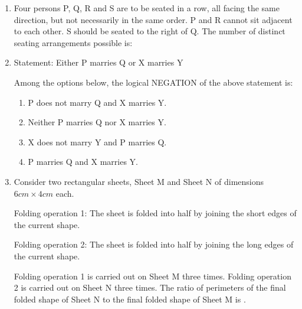 \documentclass[journal,12pt,onecolumn]{article}
\theoremstyle{remark}
\begin{document}
\begin{enumerate}
\item Four persons P, Q, R and S are to be seated in a row, all facing the same direction, but not necessarily in the same order. P and R cannot sit adjacent to each other. S should be seated to the right of Q. The number of distinct seating arrangements possible is:

\hfill{}
\begin{enumerate}
\end{enumerate}

\item Statement: Either P marries Q or X marries Y

Among the options below, the logical NEGATION of the above statement is:

\hfill{}
\begin{enumerate}
    \item P does not marry Q and X marries Y.
    \item Neither P marries Q nor X marries Y.
    \item X does not marry Y and P marries Q.
    \item P marries Q and X marries Y.
\end{enumerate}

\item Consider two rectangular sheets, Sheet M and Sheet N of dimensions $6cm \times 4cm$ each.

Folding operation 1: The sheet is folded into half by joining the short edges of the current shape.

Folding operation 2: The sheet is folded into half by joining the long edges of the current shape.

Folding operation 1 is carried out on Sheet M three times.
Folding operation 2 is carried out on Sheet N three times.
The ratio of perimeters of the final folded shape of Sheet N to the final folded shape of Sheet M is \underline{\hspace{2cm}}.

\hfill{}
\begin{enumerate}
\end{enumerate}



\end{enumerate}
\end{document}

